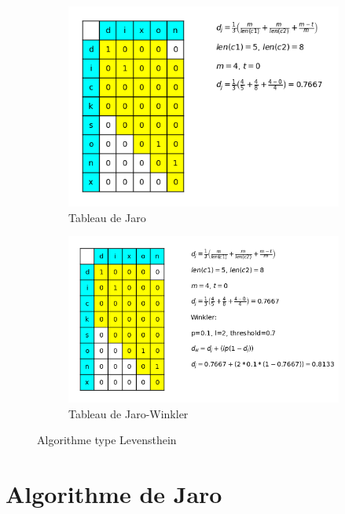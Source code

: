 \documentclass[final, 10pt]{report}
\begin{document}
\begin{figure}
    \centering
    \begin{subfigure}{0.4\textwidth}
        \includegraphics[width=.90\textwidth]{img/Table_de_Jaro.png}
        \caption{Tableau de Jaro}
        \label{fig:tab_jaro}
    \end{subfigure}
    \begin{subfigure}{0.4\textwidth}
        \includegraphics[width=.90\textwidth]{img/Table_de_Jaro-Winkler.png}
        \caption{Tableau de Jaro-Winkler}
        \label{fig:tab_winkler}
    \end{subfigure}
    \caption{Algorithme type Levensthein}
    \label{fig:algo_jaro}
\end{figure}
    
\section{Algorithme de Jaro\cite{noauthor_distance_2021}}
    
\end{document}
